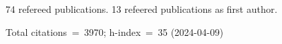 74 refereed publications. 13 refeered publications as first author.

Total citations~=~3970; h-index~=~35 (2024-04-09)